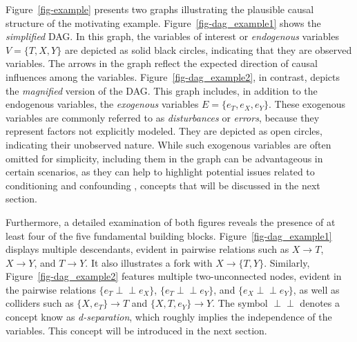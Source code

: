 \documentclass[
  authoryear,
  preprint,
  1p]{elsarticle}
\begin{document}
Figure~\ref{fig-example} presents two graphs illustrating the plausible
causal structure of the motivating example.
Figure~\ref{fig-dag_example1} shows the \emph{simplified} DAG. In this
graph, the variables of interest or \emph{endogenous} variables
\(V=\{T,X,Y\}\) are depicted as solid black circles, indicating that
they are observed variables. The arrows in the graph reflect the
expected direction of causal influences among the variables.
Figure~\ref{fig-dag_example2}, in contrast, depicts the \emph{magnified}
version of the DAG. This graph includes, in addition to the endogenous
variables, the \emph{exogenous} variables \(E=\{e_{T},e_{X},e_{Y}\}\).
These exogenous variables are commonly referred to as
\emph{disturbances} or \emph{errors}, because they represent factors not
explicitly modeled. They are depicted as open circles, indicating their
unobserved nature. While such exogenous variables are often omitted for
simplicity, including them in the graph can be advantageous in certain
scenarios, as they can help to highlight potential issues related to
conditioning and confounding \citep{Cinelli_et_al_2020}, concepts that
will be discussed in the next section.

\newcommand{\dsep}{\perp\!\!\!\perp}
\newcommand{\ndsep}{\not\!\perp\!\!\!\perp}

Furthermore, a detailed examination of both figures reveals the presence
of at least four of the five fundamental building blocks.
Figure~\ref{fig-dag_example1} displays multiple descendants, evident in
pairwise relations such as \(X \rightarrow T\), \(X \rightarrow Y\), and
\(T \rightarrow Y\). It also illustrates a fork with
\(X \rightarrow \{T,Y\}\). Similarly, Figure~\ref{fig-dag_example2}
features multiple two-unconnected nodes, evident in the pairwise
relations \(\{e_{T} \perp\!\!\!\perp e_{X}\}\),
\(\{e_{T} \perp\!\!\!\perp e_{Y}\}\), and
\(\{e_{X} \perp\!\!\!\perp e_{Y}\}\), as well as colliders such as
\(\{X,e_{T}\} \rightarrow T\) and \(\{X,T,e_{Y}\} \rightarrow Y\). The
symbol \(\perp\!\!\!\perp\) denotes a concept know as
\emph{d-separation}, which roughly implies the independence of the
variables. This concept will be introduced in the next section.
\end{document}
